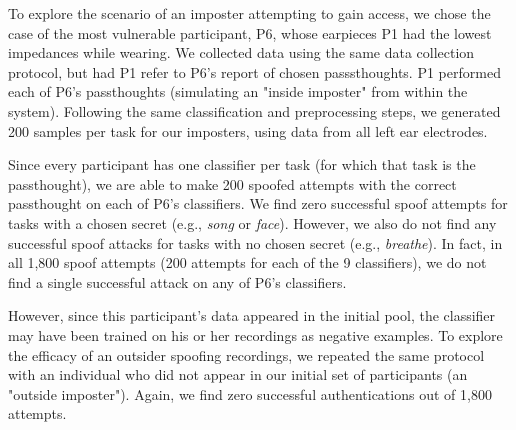 \documentclass{sigchi}
\begin{document}
To explore the scenario of an imposter attempting to gain access, we chose the case of the most vulnerable participant, P6, whose earpieces P1 had the lowest impedances while wearing. We collected data using the same data collection protocol, but had P1 refer to P6's report of chosen passsthoughts.
P1 performed each of P6's passthoughts (simulating an "inside imposter" from within the system). Following the same classification and preprocessing steps, we generated 200 samples per task for our imposters, using data from all left ear electrodes.


Since every participant has one classifier per task (for which that task is the passthought), we are able to make 200 spoofed attempts with the correct passthought on each of P6's classifiers. We find zero successful spoof attempts for tasks with a chosen secret (e.g., \textit{song} or \textit{face}). However, we also do not find any successful spoof attacks for tasks with no chosen secret (e.g., \textit{breathe}). In fact, in all 1,800 spoof attempts (200 attempts for each of the 9 classifiers), we do not find a single successful attack on any of P6's classifiers.

However, since this participant's data appeared in the initial pool, the classifier may have been trained on his or her recordings as negative examples. To explore the efficacy of an outsider spoofing recordings, we repeated the same protocol with an individual who did not appear in our initial set of participants (an "outside imposter"). Again, we find zero successful authentications out of 1,800 attempts.
\end{document}
